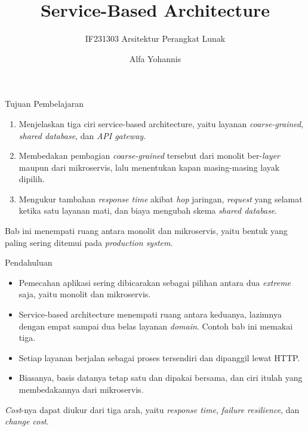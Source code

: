 \documentclass[aspectratio=169, table, 12pt]{beamer}
\title{\Huge{Service-Based Architecture}}
\subtitle{IF231303 Arsitektur Perangkat Lunak}
\author{Alfa Yohannis}
\begin{document}
\frame{\titlepage}

\begin{frame}{{\Large Tujuan Pembelajaran}}
  \vspace{10pt}
  \begin{enumerate}
    \item Menjelaskan tiga ciri service-based architecture, yaitu layanan
          \textit{coarse-grained}, \textit{shared database}, dan \textit{API gateway}.
    \item Membedakan pembagian \textit{coarse-grained} tersebut dari monolit ber-\textit{layer}
          maupun dari mikroservis, lalu menentukan kapan masing-masing layak
          dipilih.
    \item Mengukur tambahan \textit{response time} akibat \textit{hop} jaringan, \textit{request}
          yang selamat ketika satu layanan mati, dan biaya mengubah skema
          \textit{shared database}.
  \end{enumerate}

  \vspace{10pt}
  {\small Bab ini menempati ruang antara monolit dan mikroservis, yaitu bentuk
  yang paling sering ditemui pada \textit{production system}.}
\end{frame}

\begin{frame}{{\Large Pendahuluan}}
  \vspace{8pt}
  \begin{itemize}\small
    \item Pemecahan aplikasi sering dibicarakan sebagai pilihan antara dua
          \textit{extreme} saja, yaitu monolit dan mikroservis.
    \item Service-based architecture menempati ruang antara keduanya,
          lazimnya dengan empat sampai dua belas layanan \textit{domain}. Contoh
          bab ini memakai tiga.
    \item Setiap layanan berjalan sebagai proses tersendiri dan dipanggil
          lewat HTTP.
    \item Biasanya, basis datanya tetap satu dan dipakai bersama, dan ciri
          itulah yang
          membedakannya dari mikroservis.
  \end{itemize}

  \vspace{8pt}
  {\small \textit{Cost}-nya dapat diukur dari tiga arah, yaitu \textit{response time}, \textit{failure resilience}, dan \textit{change cost}.}
\end{frame}
\end{document}
